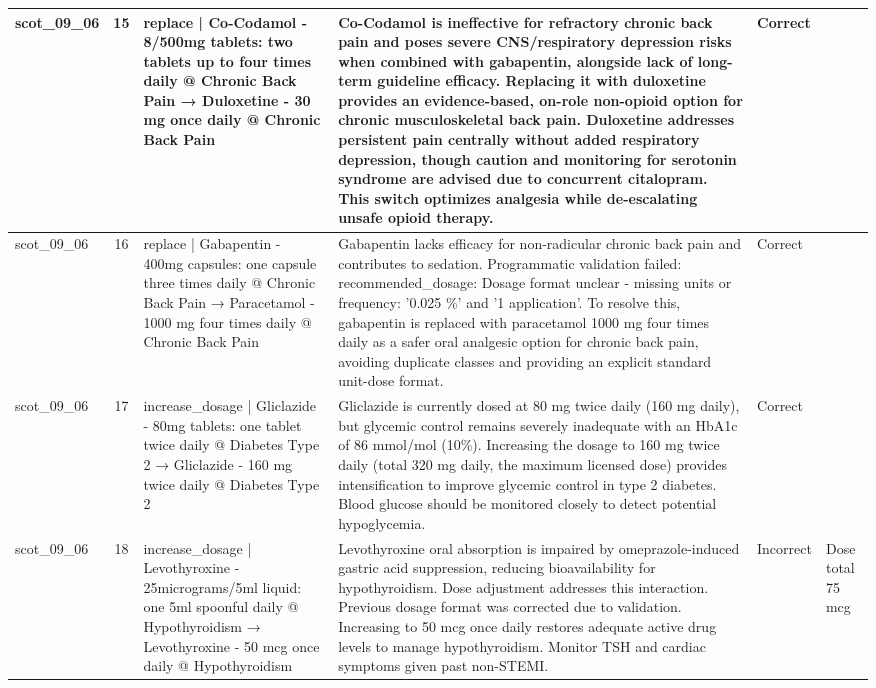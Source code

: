\begin{longtable}{|p{1.45cm}|c|p{3.3cm}|p{6.5cm}|p{1.55cm}|p{2.3cm}|}
\hline
scot\_09\_06 & 15 & replace | Co-Codamol - 8/500mg tablets: two tablets up to four times daily @ Chronic Back Pain → Duloxetine - 30 mg once daily @ Chronic Back Pain & Co-Codamol is ineffective for refractory chronic back pain and poses severe CNS/respiratory depression risks when combined with gabapentin, alongside lack of long-term guideline efficacy. Replacing it with duloxetine provides an evidence-based, on-role non-opioid option for chronic musculoskeletal back pain. Duloxetine addresses persistent pain centrally without added respiratory depression, though caution and monitoring for serotonin syndrome are advised due to concurrent citalopram. This switch optimizes analgesia while de-escalating unsafe opioid therapy. & Correct &  \\
\hline
scot\_09\_06 & 16 & replace | Gabapentin - 400mg capsules: one capsule three times daily @ Chronic Back Pain → Paracetamol - 1000 mg four times daily @ Chronic Back Pain & Gabapentin lacks efficacy for non-radicular chronic back pain and contributes to sedation. Programmatic validation failed: recommended\_dosage: Dosage format unclear - missing units or frequency: '0.025 \%' and '1 application'. To resolve this, gabapentin is replaced with paracetamol 1000 mg four times daily as a safer oral analgesic option for chronic back pain, avoiding duplicate classes and providing an explicit standard unit-dose format. & Correct &  \\
\hline
scot\_09\_06 & 17 & increase\_dosage | Gliclazide - 80mg tablets: one tablet twice daily @ Diabetes Type 2 → Gliclazide - 160 mg twice daily @ Diabetes Type 2 & Gliclazide is currently dosed at 80 mg twice daily (160 mg daily), but glycemic control remains severely inadequate with an HbA1c of 86 mmol/mol (10\%). Increasing the dosage to 160 mg twice daily (total 320 mg daily, the maximum licensed dose) provides intensification to improve glycemic control in type 2 diabetes. Blood glucose should be monitored closely to detect potential hypoglycemia. & Correct &  \\
\hline
scot\_09\_06 & 18 & increase\_dosage | Levothyroxine - 25micrograms/5ml liquid: one 5ml spoonful daily @ Hypothyroidism → Levothyroxine - 50 mcg once daily @ Hypothyroidism & Levothyroxine oral absorption is impaired by omeprazole-induced gastric acid suppression, reducing bioavailability for hypothyroidism. Dose adjustment addresses this interaction. Previous dosage format was corrected due to validation. Increasing to 50 mcg once daily restores adequate active drug levels to manage hypothyroidism. Monitor TSH and cardiac symptoms given past non-STEMI. & Incorrect & Dose total 75 mcg \\

\end{longtable}
